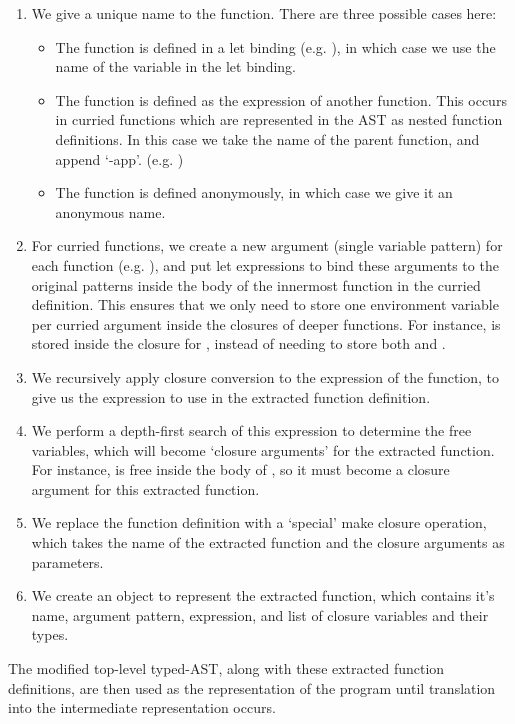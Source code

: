 \begin{enumerate}
\item We give a unique name to the function. There are three possible cases here:
\begin{itemize}
\item The function is defined in a let binding (e.g. ), in which case we use the name of the variable in the let binding.
\item The function is defined as the expression of another function. This occurs in curried functions which are represented in the AST as nested function definitions. In this case we take the name of the parent function, and append `-app'. (e.g. )
\item The function is defined anonymously, in which case we give it an anonymous name.
\end{itemize}
\item For curried functions, we create a new argument (single variable pattern) for each function (e.g. ), and put let expressions to bind these arguments to the original patterns inside the body of the innermost function in the curried definition. This ensures that we only need to store one environment variable per curried argument inside the closures of deeper functions. For instance,  is stored inside the closure for , instead of needing to store both  and .

\item We recursively apply closure conversion to the expression of the function, to give us the expression to use in the extracted function definition.
\item We perform a depth-first search of this expression to determine the free variables, which will become `closure arguments' for the extracted function. For instance,  is free inside the body of , so it must become a closure argument for this extracted function.
\item We replace the function definition with a `special' make closure operation, which takes the name of the extracted function and the closure arguments as parameters. 
\item We create an object to represent the extracted function, which contains it's name, argument pattern, expression, and list of closure variables and their types.
\end{enumerate}
The modified top-level typed-AST, along with these extracted function definitions, are then used as the representation of the program until translation into the intermediate representation occurs.


